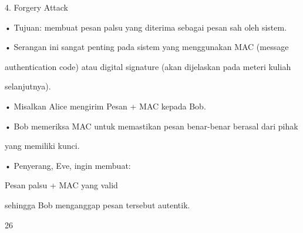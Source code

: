 \documentclass{article}
\begin{document}

4. Forgery Attack

• Tujuan: membuat pesan palsu yang diterima sebagai pesan sah oleh sistem.

• Serangan ini sangat penting pada sistem yang menggunakan MAC (message 

authentication code) atau digital signature (akan dijelaskan pada meteri kuliah 

selanjutnya).

• Misalkan Alice mengirim Pesan + MAC kepada Bob.

• Bob memeriksa MAC untuk memastikan pesan benar-benar berasal dari pihak 

yang memiliki kunci.

• Penyerang, Eve, ingin membuat:

        Pesan palsu + MAC yang valid

   sehingga Bob menganggap pesan tersebut autentik.

26
\end{document}
